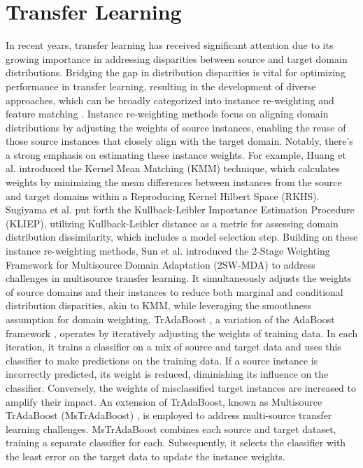 \section{Transfer Learning} 
\label{sec:3_5_transfer_learning}
In recent years, transfer learning has received significant attention due to its growing importance in addressing disparities between source and target domain distributions. Bridging the gap in distribution disparities is vital for optimizing performance in transfer learning, resulting in the development of diverse approaches, which can be broadly categorized into instance re-weighting and feature matching \cite{long2013transfer}. Instance re-weighting methods focus on aligning domain distributions by adjusting the weights of source instances, enabling the reuse of those source instances that closely align with the target domain. Notably, there's a strong emphasis on estimating these instance weights. For example, Huang et al. \cite{long2014transfer} introduced the Kernel Mean Matching (KMM) technique, which calculates weights by minimizing the mean differences between instances from the source and target domains within a Reproducing Kernel Hilbert Space (RKHS). Sugiyama et al. \cite{sun2011two} put forth the Kullback-Leibler Importance Estimation Procedure (KLIEP), utilizing Kullback-Leibler distance as a metric for assessing domain distribution dissimilarity, which includes a model selection step. Building on these instance re-weighting methods, Sun et al. \cite{dai2007boosting} introduced the 2-Stage Weighting Framework for Multisource Domain Adaptation (2SW-MDA) to address challenges in multisource transfer learning. It simultaneously adjusts the weights of source domains and their instances to reduce both marginal and conditional distribution disparities, akin to KMM, while leveraging the smoothness assumption for domain weighting. TrAdaBoost \cite{freund1996experiments}, a variation of the AdaBoost framework \cite{yao2010boosting}, operates by iteratively adjusting the weights of training data. In each iteration, it trains a classifier on a mix of source and target data and uses this classifier to make predictions on the training data. If a source instance is incorrectly predicted, its weight is reduced, diminishing its influence on the classifier. Conversely, the weights of misclassified target instances are increased to amplify their impact. An extension of TrAdaBoost, known as Multisource TrAdaBoost (MsTrAdaBoost) \cite{sun2016return}, is employed to address multi-source transfer learning challenges. MsTrAdaBoost combines each source and target dataset, training a separate classifier for each. Subsequently, it selects the classifier with the least error on the target data to update the instance weights.
